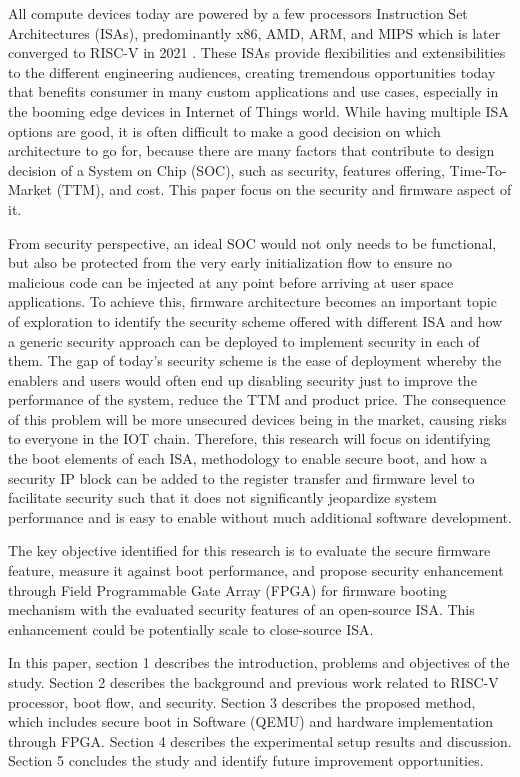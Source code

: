 \documentclass[review]{elsarticle}
\begin{document}
All compute devices today are powered by a few processors Instruction Set Architectures
(ISAs), predominantly x86, AMD, ARM, and MIPS which is later converged to RISC-V in
2021 \cite{R5:1}. These ISAs provide flexibilities and extensibilities to the
different engineering audiences, creating tremendous opportunities today that benefits
consumer in many custom applications and use cases, especially in the booming edge devices
in Internet of Things world. While having multiple ISA options are good, it is often difficult to
make a good decision on which architecture to go for, because there are many factors that
contribute to design decision of a System on Chip (SOC), such as security, features offering,
Time-To-Market (TTM), and cost. This paper focus on the security and firmware aspect of it.

From security perspective, an ideal SOC would not only needs to be functional, but also be protected
from the very early initialization flow to ensure no malicious code can be injected at any point before arriving at
user space applications. To achieve this, firmware architecture becomes an important topic
of exploration to identify the security scheme offered with different ISA and how a generic
security approach can be deployed to implement security in each of them. The gap of today’s
security scheme is the ease of deployment whereby the enablers and users would often end up
disabling security just to improve the performance of the system, reduce the TTM and product price.
The consequence of this problem will be more unsecured devices being in the market,
causing risks to everyone in the IOT chain. Therefore, this research will focus on identifying the
boot elements of each ISA, methodology to enable secure boot, and how a security IP block
can be added to the register transfer and firmware level to facilitate security such that it
does not significantly jeopardize system performance and is easy to enable without much
additional software development.

The key objective identified for this research is to
evaluate the secure firmware feature, measure it against boot performance, and propose
security enhancement through Field Programmable Gate Array (FPGA) for firmware booting
mechanism with the evaluated security features of an open-source ISA. This enhancement
could be potentially scale to close-source ISA.

In this paper, section 1 describes the introduction, problems and objectives of the study.
Section 2 describes the background and previous work related to RISC-V processor, boot flow, and
security. Section 3 describes the proposed method, which includes secure boot in Software (QEMU)
and hardware implementation through FPGA. Section 4 describes the experimental setup results and
discussion. Section 5 concludes the study and identify future improvement opportunities.
\end{document}
